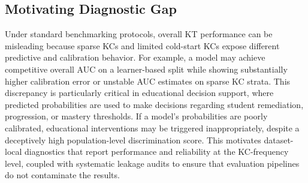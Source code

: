 \subsection{Motivating Diagnostic Gap}
Under standard benchmarking protocols, overall KT performance can be misleading because sparse KCs and limited cold-start KCs expose different predictive and calibration behavior. For example, a model may achieve competitive overall AUC on a learner-based split while showing substantially higher calibration error or unstable AUC estimates on sparse KC strata. This discrepancy is particularly critical in educational decision support, where predicted probabilities are used to make decisions regarding student remediation, progression, or mastery thresholds. If a model's probabilities are poorly calibrated, educational interventions may be triggered inappropriately, despite a deceptively high population-level discrimination score. This motivates dataset-local diagnostics that report performance and reliability at the KC-frequency level, coupled with systematic leakage audits to ensure that evaluation pipelines do not contaminate the results.

